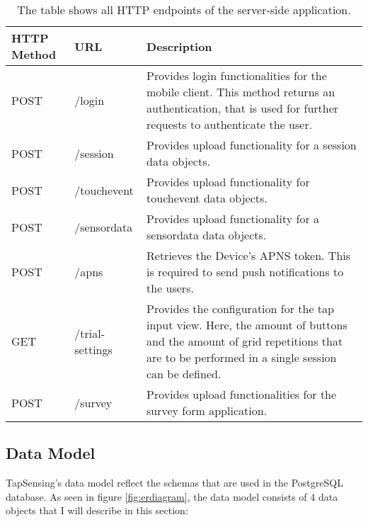 \begin{table}[h!]
  \begin{tabular}{|p{2cm}|p{4cm}|p{8cm}|}
  \hline
  \textbf{HTTP \newline Method} & \textbf{URL} & \textbf{Description} \\ \hline
  POST & /login & Provides login functionalities for the mobile client. This method returns an authentication, that is used for further requests to authenticate the user.\\
  \hline
  POST & /session & Provides upload functionality for a session data objects.\\
  \hline
  POST & /touchevent & Provides upload functionality for touchevent data objects.\\
  \hline
  POST & /sensordata & Provides upload functionality for a sensordata data objects.\\
  \hline
  POST & /apns & Retrieves the Device's APNS token. This is required to send push notifications to the users.\\
  \hline
  GET & /trial-settings & Provides the configuration for the tap input view. Here, the amount of buttons and the amount of grid repetitions that are to be performed in a single session can be defined.\\
  \hline
  POST & /survey & Provides upload functionalities for the survey form application.\\
  \hline

  \end{tabular}
  \caption{The table shows all HTTP endpoints of the server-side application.}\label{table:endpoints.}
\end{table}

\subsection{Data Model}
TapSensing's data model reflect the schemas that are used in the PostgreSQL database. As seen in figure \ref{fig:erdiagram}, the data model consists of 4 data objects that I will describe in this section:

